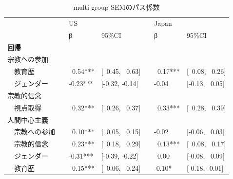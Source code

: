 \documentclass[a4j,12pt]{jreport}
\begin{document}
\begin{table}[H]
{\scriptsize
  \begin{threeparttable}
\caption{multi-group SEMのパス係数}
\label{tab:Table_SEMp}
\begin{tabular}{@{}lllllll@{}}
\toprule
                                    &  & \multicolumn{2}{l}{US}        &  & \multicolumn{2}{l}{Japan}     \\ \cmidrule(lr){3-4} \cmidrule(l){6-7} 
                                    &  & β      & 95\%CI               &  & β      & 95\%CI               \\ \midrule
\textbf{回帰}                          &  &                               &                      &  &                               &                      \\
宗教への参加                &  &                               &                      &  &                               &                      \\
~~教育歴                       &  & ~0.54***                     & {[}~0.45, ~0.63{]} &  & ~0.17***                     & {[}~0.08, ~0.26{]} \\
~~ジェンダー                          &  & -0.23***                      & {[}-0.32, -0.14{]}   &  & -0.04                         & {[}-0.13, ~0.05{]}  \\
宗教的信念                &  &                               &                      &  &                               &                      \\
~~視点取得              &  & ~0.32***                     & {[}~0.26, ~0.37{]} &  & ~0.33***                     & {[}~0.28, ~0.39{]} \\
人間中心主義                    &  &                               &                      &  &                               &                      \\
~~宗教への参加            &  & ~0.10***                     & {[}~0.05, ~0.15{]} &  & -0.02                         & {[}-0.06, ~0.03{]}  \\
~~宗教的信念            &  & ~0.23***                     & {[}~0.18, ~0.29{]} &  & ~0.13***                     & {[}~0.08, ~0.17{]} \\
~~ジェンダー                          &  & -0.31***                      & {[}-0.39, -0.22{]}   &  & ~0.00                        & {[}-0.08, ~0.09{]}  \\
~~教育歴                       &  & ~0.15***                     & {[}~0.06, ~0.24{]} &  & -0.10*  & {[}-0.18, -0.01{]}   \\

\end{tabular}
\end{threeparttable}}
\end{table}
\end{document}
